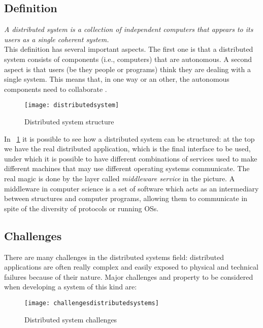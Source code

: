 \subsection{Definition}\label{distdef}
\textit{A distributed system is a collection of independent computers that appears to its users as a single coherent system.}\\
This definition has several important aspects. The first one is that a distributed system consists of components (i.e., computers) that are autonomous. A second aspect is that users (be they people or programs) think they are dealing with a single
system. This means that, in one way or an other, the autonomous components need to collaborate \cite{tanenbaum2010distributed}.\\
\begin{figure}[h]
	\centering
	\texttt{[image: distributedsystem]}
	\caption{Distributed system structure}
	\label{fig:2.8}
\end{figure}
In \figurename~\ref{fig:2.8} it is possible to see how a distributed system can be structured: at the top we have the real distributed application, which is the final interface to be used, under which it is possible to have different combinations of services used to make different machines that may use different operating systems communicate. The real magic is done by the layer called \textit{middleware service} in the picture. A middleware in computer science is a set of software which acts as an intermediary between structures and computer programs, allowing them to communicate in spite of the diversity of protocols or running OSs.

\subsection{Challenges} \label{chall}
There are many challenges in the distributed systems field: distributed applications are often really complex and easily exposed to physical and technical failures because of their nature. Major challenges and property to be considered when developing a system of this kind are:

\begin{figure}[h]
	\centering
	\texttt{[image: challengesdistributedsystems]}
	\caption{Distributed system challenges}
	\label{fig:2.9}
\end{figure} 

